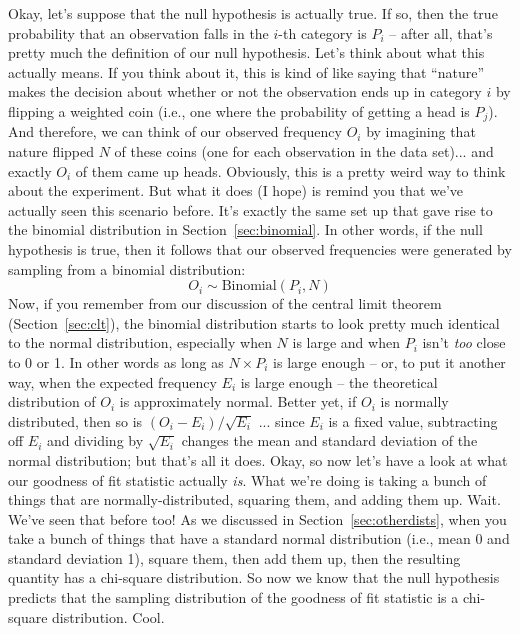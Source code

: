Okay, let's suppose that the null hypothesis is actually true. If so, then the true probability that an observation falls in the $i$-th category is $P_i$ -- after all, that's pretty much the definition of our null hypothesis. Let's think about what this actually means. If you think about it, this is kind of like saying that ``nature'' makes the decision about whether or not the observation ends up in category $i$ by flipping a weighted coin (i.e., one where the probability of getting a head is $P_j$). And therefore, we can think of our observed frequency $O_i$ by imagining that nature flipped $N$ of these coins (one for each observation in the data set)... and exactly $O_i$ of them came up heads. Obviously, this is a pretty weird way to think about the experiment. But what it does (I hope) is remind you that we've actually seen this scenario before. It's exactly the same set up that gave rise to the binomial distribution in Section~\ref{sec:binomial}. In other words, if the null hypothesis is true, then it follows that our observed frequencies were generated by sampling from a binomial distribution:
$$
O_i \sim \mbox{Binomial}(P_i, N)
$$
Now, if you remember from our discussion of the central limit theorem (Section~\ref{sec:clt}), the binomial distribution starts to look pretty much identical to the normal distribution, especially when $N$ is large and when $P_i$ isn't {\it too} close to 0 or 1. In other words as long as $N \times P_i$ is large enough -- or, to put it another way, when the expected frequency $E_i$ is large enough -- the theoretical distribution of $O_i$ is approximately normal. Better yet, if $O_i$ is normally distributed, then so is $(O_i - E_i)/\sqrt{E_i}$ ... since $E_i$ is a fixed value, subtracting off $E_i$ and dividing by $\sqrt{E_i}$ changes the mean and standard deviation of the normal distribution; but that's all it does. Okay, so now let's have a look at what our goodness of fit statistic actually {\it is}. What we're doing is taking a bunch of things that are normally-distributed, squaring them, and adding them up. Wait. We've seen that before too! As we discussed in Section~\ref{sec:otherdists}, when you take a bunch of things that have a standard normal distribution (i.e., mean 0 and standard deviation 1), square them, then add them up, then the resulting quantity has a chi-square distribution. So now we know that the null hypothesis predicts that the sampling distribution of the goodness of fit statistic is a chi-square distribution. Cool. 

